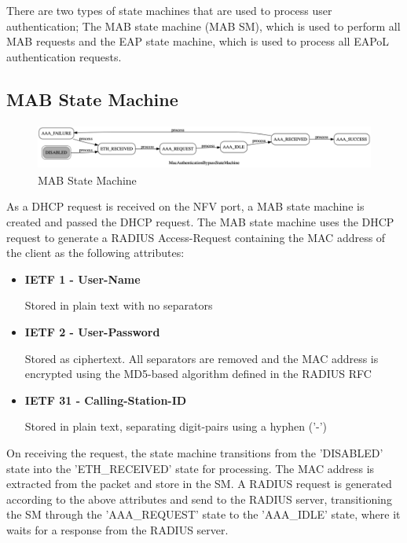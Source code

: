 There are two types of state machines that are used to process user authentication; The MAB state machine (MAB SM), which is used to perform all MAB requests and the EAP state machine, which is used to process all EAPoL authentication requests.

\subsection{MAB State Machine}
\begin{figure}\begin{center}
    \includegraphics[height=1.5cm]{images/mab_state_machine.png}
    \caption{MAB State Machine}
    \label{fig:mab_state_machine}
\end{center}\end{figure}

As a DHCP request is received on the NFV port, a MAB state machine is created and passed the DHCP request. The MAB state machine uses the DHCP request to generate a RADIUS Access-Request containing the MAC address of the client as the following attributes:
\begin{itemize}
    \item \textbf{IETF 1 - User-Name} 
    
    Stored in plain text with no separators
    \item \textbf{IETF 2 - User-Password} 
    
    Stored as ciphertext. All separators are removed and the MAC address is encrypted using the MD5-based algorithm defined in the RADIUS RFC\cite{radius_password_attribute}
    \item \textbf{IETF 31 - Calling-Station-ID} 
    
    Stored in plain text, separating digit-pairs using a hyphen ('-')
\end{itemize}

On receiving the request, the state machine transitions from the 'DISABLED' state into the 'ETH\_RECEIVED' state for processing. The MAC address is extracted from the packet and store in the SM. A RADIUS request is generated according to the above attributes and send to the RADIUS server, transitioning the SM through the 'AAA\_REQUEST' state to the 'AAA\_IDLE' state, where it waits for a response from the RADIUS server.


